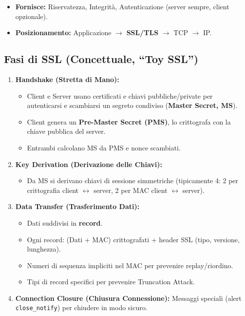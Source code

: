 \begin{itemize}
    \item \textbf{Fornisce:} Riservatezza, Integrità, Autenticazione (server sempre, client opzionale).
    \item \textbf{Posizionamento:} Applicazione $\rightarrow$ \textbf{SSL/TLS} $\rightarrow$ TCP $\rightarrow$ IP.
\end{itemize}

\subsection{Fasi di SSL (Concettuale, \textquotedblleft Toy SSL\textquotedblright{})}
\begin{enumerate}
    \item \textbf{Handshake (Stretta di Mano):}
    \begin{itemize}
        \item Client e Server usano certificati e chiavi pubbliche/private per autenticarsi e scambiarsi un segreto condiviso (\textbf{Master Secret, MS}).
        \item Client genera un \textbf{Pre-Master Secret (PMS)}, lo crittografa con la chiave pubblica del server.
        \item Entrambi calcolano MS da PMS e nonce scambiati.
    \end{itemize}
    \item \textbf{Key Derivation (Derivazione delle Chiavi):}
    \begin{itemize}
        \item Da MS si derivano chiavi di sessione simmetriche (tipicamente 4: 2 per crittografia client $\leftrightarrow$ server, 2 per MAC client $\leftrightarrow$ server).
    \end{itemize}
    \item \textbf{Data Transfer (Trasferimento Dati):}
    \begin{itemize}
        \item Dati suddivisi in \textbf{record}.
        \item Ogni record: (Dati + MAC) crittografati + header SSL (tipo, versione, lunghezza).
        \item Numeri di sequenza impliciti nel MAC per prevenire replay/riordino.
        \item Tipi di record specifici per prevenire Truncation Attack.
    \end{itemize}
    \item \textbf{Connection Closure (Chiusura Connessione):}
    Messaggi speciali (alert \texttt{close\_notify}) per chiudere in modo sicuro.
\end{enumerate}


